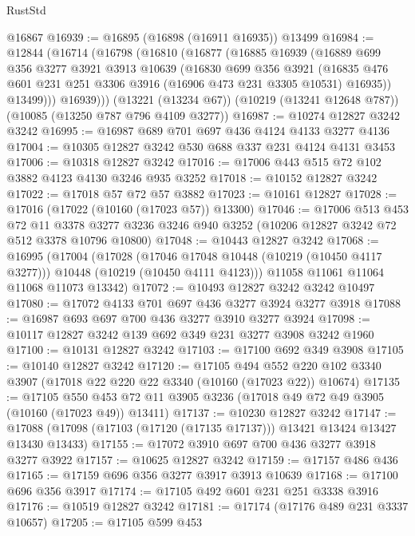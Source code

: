 \begin{lexlean}{RustStd}
\begin{coremodule}
    @16867
@16939 := @16895 (@16898 (@16911 @16935)) @13499
@16984 := @12844
    (@16714
      (@16798
        (@16810
          (@16877
            (@16885
              @16939
              (@16889
                @699
                @356
                @3277
                @3921
                @3913
                @10639
                (@16830
                  @699
                  @356
                  @3921
                  (@16835 @476 @601 @231 @251 @3306 @3916 (@16906 @473 @231 @3305 @10531) @16935))
                @13499)))
          @16939)))
    (@13221 (@13234 @67))
    (@10219 (@13241 @12648 @787))
    (@10085 (@13250 @787 @796 @4109 @3277))
@16987 := @10274 @12827 @3242 @3242
@16995 := @16987 @689 @701 @697 @436 @4124 @4133 @3277 @4136
@17004 := @10305 @12827 @3242 @530 @688 @337 @231 @4124 @4131 @3453
@17006 := @10318 @12827 @3242
@17016 := @17006 @443 @515 @72 @102 @3882 @4123 @4130 @3246 @935 @3252
@17018 := @10152 @12827 @3242
@17022 := @17018 @57 @72 @57 @3882
@17023 := @10161 @12827
@17028 := @17016 (@17022 (@10160 (@17023 @57)) @13300)
@17046 := @17006
    @513
    @453
    @72
    @11
    @3378
    @3277
    @3236
    @3246
    @940
    @3252
    (@10206 @12827 @3242 @72 @512 @3378 @10796 @10800)
@17048 := @10443 @12827 @3242
@17068 := @16995
    (@17004
      (@17028
        (@17046 @17048 @10448 (@10219 (@10450 @4117 @3277)))
        @10448
        (@10219 (@10450 @4111 @4123)))
      @11058
      @11061
      @11064
      @11068
      @11073
      @13342)
@17072 := @10493 @12827 @3242 @3242 @10497
@17080 := @17072 @4133 @701 @697 @436 @3277 @3924 @3277 @3918
@17088 := @16987 @693 @697 @700 @436 @3277 @3910 @3277 @3924
@17098 := @10117 @12827 @3242 @139 @692 @349 @231 @3277 @3908 @3242 @1960
@17100 := @10131 @12827 @3242
@17103 := @17100 @692 @349 @3908
@17105 := @10140 @12827 @3242
@17120 := @17105
    @494
    @552
    @220
    @102
    @3340
    @3907
    (@17018 @22 @220 @22 @3340 (@10160 (@17023 @22)) @10674)
@17135 := @17105
    @550
    @453
    @72
    @11
    @3905
    @3236
    (@17018 @49 @72 @49 @3905 (@10160 (@17023 @49)) @13411)
@17137 := @10230 @12827 @3242
@17147 := @17088 (@17098 (@17103 (@17120 (@17135 @17137))) @13421 @13424 @13427 @13430 @13433)
@17155 := @17072 @3910 @697 @700 @436 @3277 @3918 @3277 @3922
@17157 := @10625 @12827 @3242
@17159 := @17157 @486 @436
@17165 := @17159 @696 @356 @3277 @3917 @3913 @10639
@17168 := @17100 @696 @356 @3917
@17174 := @17105 @492 @601 @231 @251 @3338 @3916
@17176 := @10519 @12827 @3242
@17181 := @17174 (@17176 @489 @231 @3337 @10657)
@17205 := @17105
    @599
    @453

\end{coremodule}
\end{lexlean}
